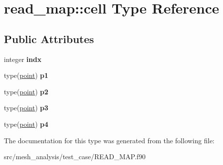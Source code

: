 \hypertarget{structread__map_1_1cell}{}\section{read\+\_\+map\+:\+:cell Type Reference}
\label{structread__map_1_1cell}
\subsection*{Public Attributes}
\begin{DoxyCompactItemize}
\item 
\mbox{\label{structread__map_1_1cell_aac3c2e254c3d91c325600f9a6e2d602a}} 
integer {\bfseries indx}
\item 
\mbox{\label{structread__map_1_1cell_a0580cf5e279ed193870de365a2a3fdf7}} 
type(\hyperlink{structread__map_1_1point}{point}) {\bfseries p1}
\item 
\mbox{\label{structread__map_1_1cell_ad1577807c3ac52d15f99013af905bede}} 
type(\hyperlink{structread__map_1_1point}{point}) {\bfseries p2}
\item 
\mbox{\label{structread__map_1_1cell_a15ad0a036da594a5c274e7e4d8f3abef}} 
type(\hyperlink{structread__map_1_1point}{point}) {\bfseries p3}
\item 
\mbox{\label{structread__map_1_1cell_a0a8538fb34ba6c0ae71941b0e32f46af}} 
type(\hyperlink{structread__map_1_1point}{point}) {\bfseries p4}
\end{DoxyCompactItemize}


The documentation for this type was generated from the following file\+:\begin{DoxyCompactItemize}
\item 
src/mesh\+\_\+analysis/test\+\_\+case/R\+E\+A\+D\+\_\+\+M\+A\+P.\+f90\end{DoxyCompactItemize}
